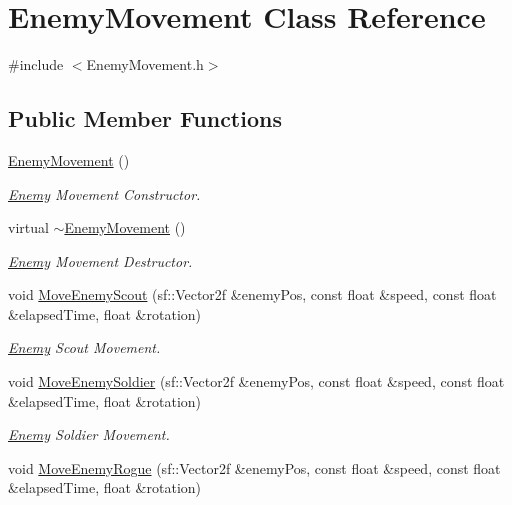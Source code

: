 \hypertarget{class_enemy_movement}{}\section{Enemy\+Movement Class Reference}
\label{class_enemy_movement}


{\ttfamily \#include $<$Enemy\+Movement.\+h$>$}

\subsection*{Public Member Functions}
\begin{DoxyCompactItemize}
\item 
\hyperlink{class_enemy_movement_ac6f13581112bc274a27105efa6cfc7d7}{Enemy\+Movement} ()
\begin{DoxyCompactList}\small\item\em \hyperlink{class_enemy}{Enemy} Movement Constructor. \end{DoxyCompactList}\item 
virtual \hyperlink{class_enemy_movement_ae99f4997a60564fcb672030c7b0d3be2}{$\sim$\+Enemy\+Movement} ()
\begin{DoxyCompactList}\small\item\em \hyperlink{class_enemy}{Enemy} Movement Destructor. \end{DoxyCompactList}\item 
void \hyperlink{class_enemy_movement_ac4b06df6242ceae2925ca689cef4cfba}{Move\+Enemy\+Scout} (sf\+::\+Vector2f \&enemy\+Pos, const float \&speed, const float \&elapsed\+Time, float \&rotation)
\begin{DoxyCompactList}\small\item\em \hyperlink{class_enemy}{Enemy} Scout Movement. \end{DoxyCompactList}\item 
void \hyperlink{class_enemy_movement_ae4f8dc0bcd83424c4d6ce76300bdf2c8}{Move\+Enemy\+Soldier} (sf\+::\+Vector2f \&enemy\+Pos, const float \&speed, const float \&elapsed\+Time, float \&rotation)
\begin{DoxyCompactList}\small\item\em \hyperlink{class_enemy}{Enemy} Soldier Movement. \end{DoxyCompactList}\item 
void \hyperlink{class_enemy_movement_a6e09641ef866d6a45c6ef342c905bc14}{Move\+Enemy\+Rogue} (sf\+::\+Vector2f \&enemy\+Pos, const float \&speed, const float \&elapsed\+Time, float \&rotation)

\end{DoxyCompactItemize}
